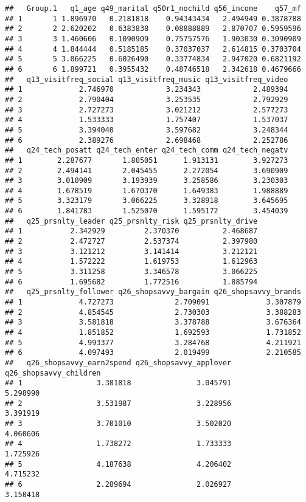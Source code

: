 \documentclass[]{article}
\begin{document}
\begin{verbatim}
##   Group.1   q1_age q49_marital q50r1_nochild q56_income    q57_mf
## 1       1 1.896970   0.2181818    0.94343434   2.494949 0.3878788
## 2       2 2.620202   0.6383838    0.08888889   2.870707 0.5959596
## 3       3 1.460606   0.1090909    0.75757576   1.903030 0.3090909
## 4       4 1.844444   0.5185185    0.37037037   2.614815 0.3703704
## 5       5 3.066225   0.6026490    0.33774834   2.947020 0.6821192
## 6       6 1.899721   0.3955432    0.48746518   2.342618 0.4679666
##   q13_visitfreq_social q13_visitfreq_music q13_visitfreq_video
## 1             2.746970            3.234343            2.489394
## 2             2.790404            3.253535            2.792929
## 3             2.727273            3.021212            2.577273
## 4             1.533333            1.757407            1.537037
## 5             3.394040            3.597682            3.248344
## 6             2.389276            2.698468            2.252786
##   q24_tech_posatt q24_tech_enter q24_tech_comm q24_tech_negatv
## 1        2.287677       1.805051      1.913131        3.927273
## 2        2.494141       2.045455      2.272054        3.690909
## 3        3.010909       3.193939      3.258586        3.230303
## 4        1.678519       1.670370      1.649383        1.988889
## 5        3.323179       3.066225      3.328918        3.645695
## 6        1.841783       1.525070      1.595172        3.454039
##   q25_prsnlty_leader q25_prsnlty_risk q25_prsnlty_drive
## 1           2.342929         2.370370          2.468687
## 2           2.472727         2.537374          2.397980
## 3           3.121212         3.141414          3.212121
## 4           1.572222         1.619753          1.612963
## 5           3.311258         3.346578          3.066225
## 6           1.695682         1.772516          1.885794
##   q25_prsnlty_follower q26_shopsavvy_bargain q26_shopsavvy_brands
## 1             4.727273              2.709091             3.307879
## 2             4.854545              2.730303             3.388283
## 3             3.581818              3.378788             3.676364
## 4             1.851852              1.692593             1.731852
## 5             4.993377              3.284768             4.211921
## 6             4.097493              2.019499             2.210585
##   q26_shopsavvy_earn2spend q26_shopsavvy_applover q26_shopsavvy_children
## 1                 3.381818               3.045791               5.298990
## 2                 3.531987               3.228956               3.391919
## 3                 3.701010               3.502020               4.060606
## 4                 1.738272               1.733333               1.725926
## 5                 4.187638               4.206402               4.715232
## 6                 2.289694               2.026927               3.150418
\end{verbatim}
\end{document}

